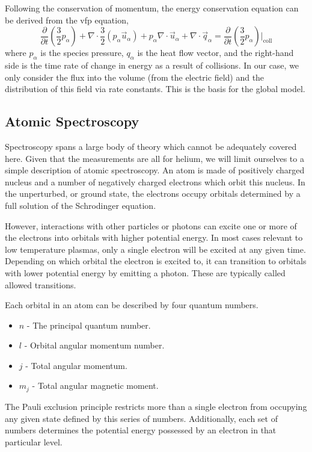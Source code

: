 Following the conservation of momentum, the energy conservation equation
can be derived from the \acs{vfp} equation,
\begin{equation}
  \frac{\partial}{\partial t}\left(\frac{3}{2}p_\alpha\right) 
  + \nabla\cdot\frac{3}{2} (p_\alpha\vec{u}_\alpha)
  + p_\alpha\nabla\cdot\vec{u}_\alpha
  + \nabla\cdot\vec{q}_\alpha
  = \frac{\partial}{\partial
  t}\left(\frac{3}{2}p_\alpha\right)\bigg|_\mathrm{coll}
\end{equation}
where $p_\alpha$ is the species pressure, $q_\alpha$ is the heat flow
vector, and the right-hand side is the time rate of change in energy as
a result of collisions. In our case, we only consider the flux into the
volume (from the electric field) and the distribution of this field via
rate constants. This is the basis for the global model.

\subsection{Atomic Spectroscopy}

Spectroscopy spans a large body of theory which cannot be adequately
covered here. Given that the measurements are all for helium, we will
limit ourselves to a simple description of atomic spectroscopy. An atom
is made of positively charged nucleus and a number of negatively charged
electrons which orbit this nucleus. In the unperturbed, or ground state,
the electrons occupy orbitals determined by a full solution of the
Schrodinger equation.

However, interactions with other particles or photons can excite one or
more of the electrons into orbitals with higher potential energy. In
most cases relevant to low temperature plasmas, only a single electron
will be excited at any given time. Depending on which orbital the
electron is excited to, it can transition to orbitals with lower
potential energy by emitting a photon. These are typically called
allowed transitions.

Each orbital in an atom can be described by four quantum numbers.
\begin{itemize}
  \item $n$ - The principal quantum number.
  \item $l$ - Orbital angular momentum number.
  \item $j$ - Total angular momentum.
  \item $m_j$ - Total angular magnetic moment.
\end{itemize}
The Pauli exclusion principle restricts more than a single electron from
occupying any given state defined by this series of numbers.
Additionally, each set of numbers determines the potential energy
possessed by an electron in that particular level. 

